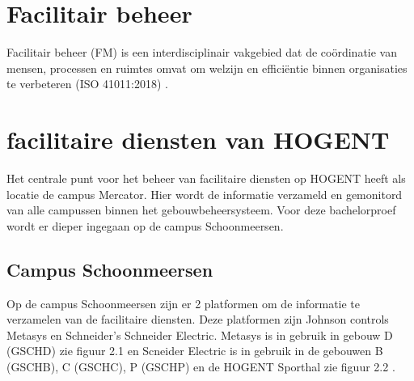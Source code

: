 %


\section{Facilitair beheer}
Facilitair beheer (FM) is een interdisciplinair vakgebied dat de coördinatie van mensen, processen en ruimtes omvat om welzijn en efficiëntie binnen organisaties te verbeteren (ISO 41011:2018) \autocite{jaouhari2023we}. 

\section{facilitaire diensten van HOGENT}
Het centrale punt voor het beheer van facilitaire diensten op HOGENT heeft als locatie de campus Mercator. Hier wordt de informatie verzameld en gemonitord van alle campussen binnen het gebouwbeheersysteem. Voor deze bachelorproef wordt er dieper ingegaan op de campus Schoonmeersen.

\subsection{Campus Schoonmeersen}
Op de campus Schoonmeersen zijn er 2 platformen om de informatie te verzamelen van de facilitaire diensten. Deze platformen zijn Johnson controls Metasys en Schneider's Schneider Electric. Metasys is in gebruik in gebouw D (GSCHD) zie figuur 2.1 en Scneider Electric is in gebruik in de gebouwen B (GSCHB), C (GSCHC), P (GSCHP) en de HOGENT Sporthal zie figuur 2.2 \autocite{Venneman2019}.

